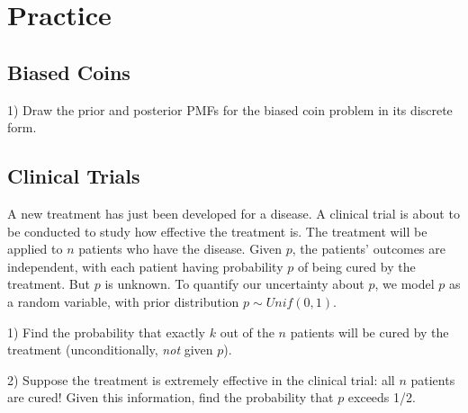 \documentclass[11pt,a4paper]{article}
\begin{document}
\section{Practice}

\subsection{Biased Coins}

1) Draw the prior and posterior PMFs for the biased coin problem in its discrete form.

\subsection{Clinical Trials}

A new treatment has just been developed for a disease. 
A clinical trial is about to be conducted to study how effective the treatment is. 
The treatment will be applied to \(n\) patients who have the disease. 
Given \(p\), 
the patients' outcomes are independent, 
with each patient having probability \(p\) of being cured by the treatment. 
But \(p\) is unknown. 
To quantify our uncertainty about \(p\), 
we model \(p\) as a random variable, 
with prior distribution \(p \sim Unif(0,1)\).

1) Find the probability that exactly \(k\) out of the \(n\) patients will be 
cured by the treatment (unconditionally, \emph{not} given \(p\)).

2) Suppose the treatment is extremely effective in the clinical trial: all \(n\) patients are cured! 
Given this information, find the probability that \(p\) exceeds 1/2.
\end{document}
